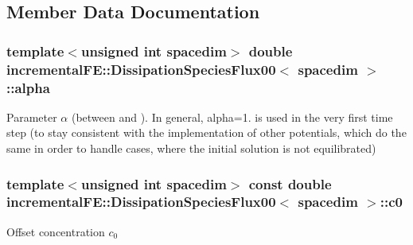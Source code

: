 \subsection{Member Data Documentation}
\subsubsection[{\texorpdfstring{alpha}{alpha}}]{\setlength{\rightskip}{0pt plus 5cm}template$<$unsigned int spacedim$>$ double {\bf incremental\+F\+E\+::\+Dissipation\+Species\+Flux00}$<$ spacedim $>$\+::alpha\hspace{0.3cm}{\ttfamily [private]}}\hypertarget{classincremental_f_e_1_1_dissipation_species_flux00_a794d510401280099eb0100d4e8d1a040}{}\label{classincremental_f_e_1_1_dissipation_species_flux00_a794d510401280099eb0100d4e8d1a040}
Parameter $\alpha$ (between {} and {}). In general, {\ttfamily alpha=1.} is used in the very first time step (to stay consistent with the implementation of other potentials, which do the same in order to handle cases, where the initial solution is not equilibrated) 
\subsubsection[{\texorpdfstring{c0}{c0}}]{\setlength{\rightskip}{0pt plus 5cm}template$<$unsigned int spacedim$>$ const double {\bf incremental\+F\+E\+::\+Dissipation\+Species\+Flux00}$<$ spacedim $>$\+::c0\hspace{0.3cm}{\ttfamily [private]}}\hypertarget{classincremental_f_e_1_1_dissipation_species_flux00_a273359d9f5f84374f853a16b95ad7abb}{}\label{classincremental_f_e_1_1_dissipation_species_flux00_a273359d9f5f84374f853a16b95ad7abb}
Offset concentration $c_0$ 

